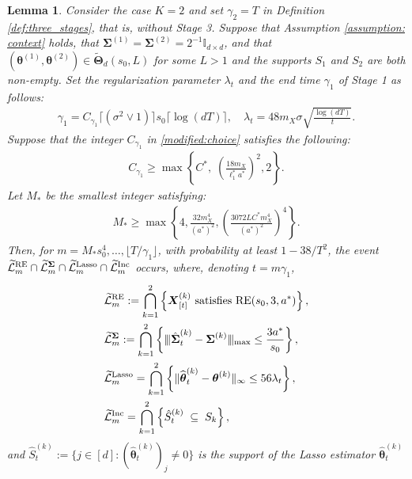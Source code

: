 \documentclass[aos,preprint]{imsart}
\theoremstyle{plain}
\newtheorem{lemma}[theorem]{Lemma}
\theoremstyle{definition}
\newcommand{\bTheta}{\boldsymbol{\Theta}}
\newcommand{\btheta}{\boldsymbol{\theta}}
\newcommand{\hbtheta}{\widehat{\boldsymbol{\theta}}}
\newcommand{\bX}{\boldsymbol{X}}
\newcommand{\bSigma}{\boldsymbol{\Sigma}}
\newcommand{\mn}{\vert\kern-0.25ex \vert\kern-0.25ex \vert}
\newcommand{\hbSigma}{\hat{\boldsymbol{\Sigma}}}
\newcommand{\tL}{\widetilde{\mathcal{L}}}
\begin{document}
\begin{appendix}
\begin{lemma}  \label{lemma:LassoBandit}
Consider the case $K =2$ and set $\gamma_2 = T$ in Definition \ref{def:three_stages}, that is, without Stage 3. 
Suppose that Assumption  \ref{assumption: context}  holds, that $\bSigma^{(1)} = \bSigma^{(2)} = 2^{-1} \mathbb{I}_{d \times d}$, and that  $(\btheta^{(1)}, \btheta^{(2)}) \in \widetilde{\bTheta}_{d}(s_0,L)$ for some $L > 1$ and the supports $S_1$ and $S_2$ are both non-empty. Set the regularization parameter $\lambda_t$   and the end time $\gamma_1$ of Stage 1 
as follows:
\begin{align}
    \label{modified:choice}
\gamma_1 = C_{\gamma_1} \lceil(\sigma^2\vee 1)\rceil s_0 \lceil \log (dT) \rceil, \quad
\lambda_t = 48 m_X\sigma\sqrt{\frac{\log (dT)}{t}}.
\end{align}
Suppose that the integer   $C_{\gamma_1}$ in \eqref{modified:choice} satisfies the following:
\begin{align}
    \label{eq: lassobandit_lambda_gamma_12}
     C_{\gamma_1} \ge \max\left\{C^*,\; \left(\frac{18m_X}{\ell_1^* a^*}\right)^2,2\right\}.
\end{align}
Let $M_*$ be the smallest integer satisfying:  
\begin{align}\label{def: M_star}
     M_* \geq  \max\left\{4, \frac{32 m_{X}^4}{(a^*)^2}, \left(\frac{3072 L  C^* m_X^4}{(a^*)^2} \right)^4 \right\}.
\end{align}
Then,  for $m = M_* s_0^4, \ldots, \lfloor T/\gamma_1\rfloor$, with probability at least $1-38/T^2$,  the event $\tL_m^{\textup{RE}} \cap \tL_m^{\bSigma} \cap  \tL_m^{\textup{Lasso}} \cap \tL_m^{\textup{Inc}}$ occurs, where, denoting $t = m\gamma_1$,
\begin{align} \label{LassoBandit:events}
\begin{split}
&\tL_m^{\textup{RE}} := \bigcap_{k=1}^{2}\left\{\bX_{[t]}^{(k)} \textup{ satisfies } \textup{RE}(s_0, 3, a^*)\right\}, \\
& \tL_m^{\bSigma} := \bigcap_{k=1}^{2}\left\{\mn\hbSigma_{t}^{(k)}-\bSigma^{(k)}\mn_{\textup{max}} \le  \frac{3 a^*}{s_0} \right\},\\ 
&\tL_m^{\textup{Lasso}} = \bigcap_{k = 1}^{2}\left\{\|\hbtheta_{t}^{(k)} - \btheta^{(k)}\|_{\infty} \leq  56\lambda_{t}\right\},\\
&\tL_m^{\textup{Inc}} =  \bigcap_{k=1}^{2}\left\{ \hat{S}_t^{(k)} \; \subseteq \; S_k 
\right\},
\end{split}
\end{align}
and $\hat{S}_t^{(k)} := \{j \in [d]: (\hbtheta_{t}^{(k)})_j \neq 0\}$ is the support of the Lasso estimator $\hbtheta_{t}^{(k)}$

\end{lemma}
\end{appendix}
\end{document}
